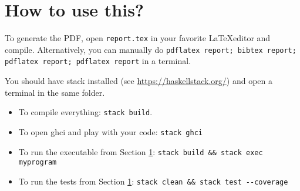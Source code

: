 
\section{How to use this?}

To generate the PDF, open \texttt{report.tex} in your favorite \LaTeX editor and compile.
Alternatively, you can manually do
\texttt{pdflatex report; bibtex report; pdflatex report; pdflatex report} in a terminal.

You should have stack installed (see \url{https://haskellstack.org/}) and
open a terminal in the same folder.

\begin{itemize}
  \item To compile everything: \verb|stack build|.
  \item To open ghci and play with your code: \verb|stack ghci|
  \item To run the executable from Section \ref{}: \verb|stack build && stack exec myprogram|
  \item To run the tests from Section \ref{}: \verb|stack clean && stack test --coverage|
\end{itemize}
